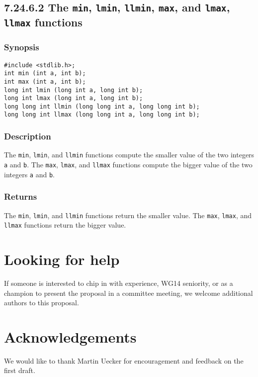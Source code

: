 \documentclass[a4paper,10pt]{scrartcl}
\begin{document}
\begin{mdframed}
    \subsection*{7.24.6.2 The \lstinline{min}, \lstinline{lmin}, \lstinline{llmin}, \lstinline{max}, and \lstinline{lmax}, \lstinline{llmax} functions}
    \subsubsection*{Synopsis}
    \begin{lstlisting}
#include <stdlib.h>;
int min (int a, int b);
int max (int a, int b);
long int lmin (long int a, long int b);
long int lmax (long int a, long int b);
long long int llmin (long long int a, long long int b);
long long int llmax (long long int a, long long int b);
    \end{lstlisting}
    \subsubsection*{Description}
    The \lstinline{min}, \lstinline{lmin}, and \lstinline{llmin} functions compute the smaller value of the two
    integers \lstinline{a} and \lstinline{b}.
    The \lstinline{max}, \lstinline{lmax}, and \lstinline{llmax} functions compute the bigger value of the two
    integers \lstinline{a} and \lstinline{b}.
    \subsubsection*{Returns}
    The \lstinline{min}, \lstinline{lmin}, and \lstinline{llmin} functions return the smaller value.
    The \lstinline{max}, \lstinline{lmax}, and \lstinline{llmax} functions return the bigger value.
\end{mdframed}

\section{Looking for help}
If someone is interested to chip in with experience, WG14 seniority, or as a champion to present the proposal in a committee meeting, we welcome additional authors to this proposal.

\section{Acknowledgements}
We would like to thank Martin Uecker for encouragement and feedback on the first draft.
\end{document}
